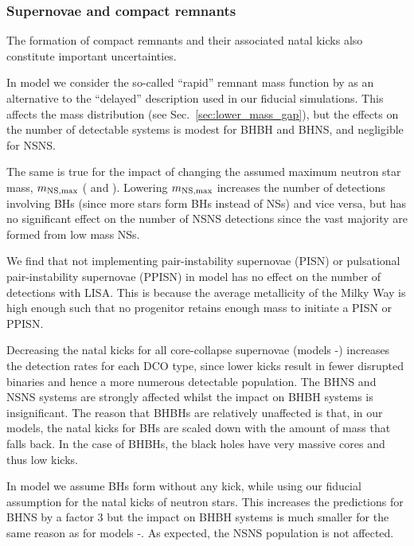 \subsubsection{Supernovae and compact remnants}

The formation of compact remnants and their associated natal kicks also constitute important uncertainties.  

In model \modRapid{} we consider the so-called ``rapid'' remnant mass function by \citet{Fryer+2015} as an alternative to the ``delayed'' description used in our fiducial simulations. This affects the mass distribution (see Sec.~\ref{sec:lower_mass_gap}), but the effects on the number of detectable systems is modest for BHBH and BHNS, and negligible for NSNS.  

The same is true for the impact of changing the assumed maximum neutron star mass, $m_{\rm NS, max}$ (\modNSLow{} and \modNSHigh{}). Lowering $m_{\rm NS, max}$ increases the number of detections involving BHs (since more stars form BHs instead of NSs) and vice versa, but has no significant effect on the number of NSNS detections since the vast majority are formed from low mass NSs.

We find that not implementing pair-instability supernovae (PISN) or pulsational pair-instability supernovae (PPISN) in model \modNoPISN{} has no effect on the number of detections with LISA. This is because the average metallicity of the Milky Way is high enough such that no progenitor retains enough mass to initiate a PISN or PPISN.

Decreasing the natal kicks for all core-collapse supernovae (models \modSigLow{}-\modSigLower{}) increases the detection rates for each DCO type, since lower kicks result in fewer disrupted binaries and hence a more numerous detectable population. The BHNS and NSNS systems are strongly affected whilst the impact on BHBH systems is insignificant. The reason that BHBHs are relatively unaffected is that, in our models, the natal kicks for BHs are scaled down with the amount of mass that falls back. In the case of BHBHs, the black holes have very massive cores and thus low kicks.

In model \modNoBH{} we assume BHs form without any kick, while using our fiducial assumption for the natal kicks of neutron stars. This increases the predictions for BHNS by a factor 3 but the impact on BHBH systems is much smaller for the same reason as for models \modSigLow{}-\modSigLower{}. As expected, the NSNS population is not affected. 

